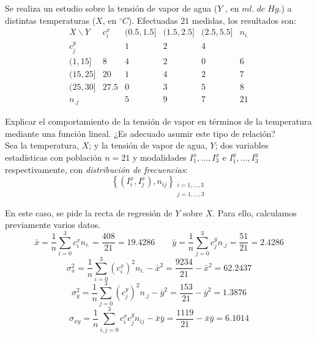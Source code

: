 \begin{ejercicio}\label{ej:2.Ejercicio4}
    Se realiza un estudio sobre la tensión de vapor de agua ($Y$ , en $ml.\;de\;Hg$.) a distintas temperaturas ($X$, en $^\circ C$). Efectuadas 21 medidas, los resultados son:
    \begin{equation*}
        \begin{array}{c||c|ccc|c}
            X\backslash Y & c^x_i & (0.5, 1.5] & (1.5, 2.5] & (2.5, 5.5] & n_{i.}\\ \hline \hline
            c^y_j & & 1 & 2 & 4 \\ \hline
            (1,15] &8& 4 & 2 & 0 & 6\\
            (15, 25] &20& 1 & 4 & 2 & 7\\
            (25,30] &27.5& 0 & 3 & 5 & 8\\ \hline
            n_{.j} &&5 & 9 & 7 & 21
        \end{array}
    \end{equation*}

    Explicar el comportamiento de la tensión de vapor en términos de la temperatura mediante una función lineal. ¿Es adecuado asumir este tipo de relación?\\

    Sea la temperatura, $X$; y la tensión de vapor de agua, $Y$; dos variables estadísticas con población $n=21$ y modalidades $I^x_1, \dots, I^x_3$ e $I^y_1, \dots, I^y_3$ respectivamente, con \emph{distribución de frecuencias}:
        $$\left\{ (I^x_i,I^x_j), n_{ij}\right\}_{\substack{i=1,\dots,3\\j=1,\dots,3}}$$

    En este caso, se pide la recta de regresión de $Y$ sobre $X$. Para ello, calculamos previamente varios datos.
    \begin{equation*}
        \bar{x} = \frac{1}{n}\sum_{i=0}^3 c_i^x n_{i.} = \frac{408}{21} = 19.4286
        \qquad
        \bar{y} = \frac{1}{n}\sum_{j=0}^3 c_j^y n_{.j} = \frac{51}{21} = 2.4286
    \end{equation*}
    \begin{equation*}
        \sigma_x^2 = \frac{1}{n}\sum_{i=0}^3 (c_i^x)^2n_{i.} - \bar{x}^2 = \frac{9234}{21} - \bar{x}^2 = 62.2437
    \end{equation*}
    \begin{equation*}
        \sigma_y^2 = \frac{1}{n}\sum_{j=0}^3 (c_j^y)^2n_{.j} - \bar{y}^2 = \frac{153}{21} - \bar{y}^2 = 1.3876
    \end{equation*}
    \begin{equation*}
        \sigma_{xy} = \frac{1}{n}\sum_{i,j=0}^3 c_i^x c_j^y n_{ij}  -\bar{x}\bar{y} = \frac{1119}{21} -\bar{x}\bar{y} = 6.1014
    \end{equation*}


\end{ejercicio}
